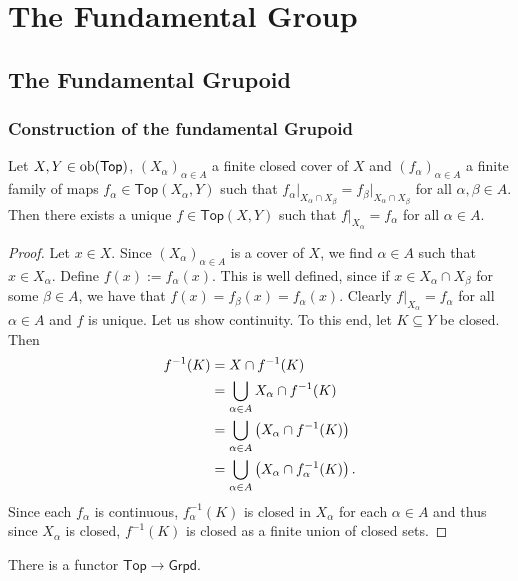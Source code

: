 \chapter{The Fundamental Group}
\section*{The Fundamental Grupoid}
\subsection*{Construction of the fundamental Grupoid}

\begin{lemma}
	Let $X,Y \in \operatorname{ob}(\mathsf{Top})$, $(X_\alpha)_{\alpha \in A}$ a finite closed cover of $X$ and $(f_\alpha)_{\alpha \in A}$ a finite family of maps $f_\alpha \in \mathsf{Top}(X_\alpha,Y)$ such that $f_\alpha\vert_{X_\alpha \cap X_\beta} = f_\beta\vert_{X_\alpha \cap X_\beta}$ for all $\alpha,\beta \in A$. Then there exists a unique $f \in \mathsf{Top}(X,Y)$ such that $f\vert_{X_\alpha} = f_\alpha$ for all $\alpha \in A$.
	\label{lem:gluing_lemma}
\end{lemma}

\begin{proof}
	Let $x \in X$. Since $(X_\alpha)_{\alpha \in A}$ is a cover of $X$, we find $\alpha \in A$ such that $x \in X_\alpha$. Define $f(x) := f_\alpha(x)$. This is well defined, since if $x \in X_\alpha \cap X_\beta$ for some $\beta \in A$, we have that $f(x) = f_\beta(x) = f_\alpha(x)$. Clearly $f\vert_{X_\alpha} = f_\alpha$ for all $\alpha \in A$ and $f$ is unique. Let us show continuity. To this end, let $K \subseteq Y$ be closed. Then 
	\begin{align*}
		f^{-1}(K) &= X \cap f^{-1}(K)\\
		&= \bigcup_{\alpha \in A} X_\alpha \cap f^{-1}(K)\\
		&= \bigcup_{\alpha \in A} \del[1]{X_\alpha \cap f^{-1}(K)}\\
		&= \bigcup_{\alpha \in A} \del[1]{X_\alpha \cap f_\alpha^{-1}(K)}. 
	\end{align*}
	Since each $f_\alpha$ is continuous, $f_\alpha^{-1}(K)$ is closed in $X_\alpha$ for each $\alpha \in A$ and thus since $X_\alpha$ is closed, $f^{-1}(K)$ is closed as a finite union of closed sets.
\end{proof}

\begin{theorem}
	There is a functor $\mathsf{Top} \to \mathsf{Grpd}$.
	\label{thm:fundamental_groupoid}
\end{theorem}

